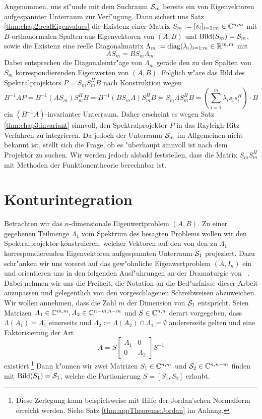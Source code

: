 Angenommen, uns st"unde mit dem Suchraum $\S_m$ bereits ein von Eigenvektoren
aufgespannter Unterraum zur Verf"ugung. Dann sichert uns Satz \ref{thm:chap2:realEigenvalues} die Existenz einer Matrix $S_m := [s_i]_{i=1:m}\in\C^{n,m}$ mit
$B$-orthonormalen Spalten aus Eigenvektoren von $(A,B)$ und $\Bild(S_m)=\S_m$, sowie die Existenz eine reelle Diagonalmatrix
$\Lambda_m := \text{diag}(\lambda_i)_{i=1:m}\in\R^{m,m}$ mit
\[
AS_m = BS_m\Lambda_m.
\]
Dabei entsprechen die Diagonaleintr"age von $\Lambda_m$ gerade den zu den Spalten
von $S_m$ korrespondierenden Eigenwerten von $(A,B)$. Folglich w"are das Bild
des Spektralprojektors $P=S_m S_m^H B$ nach Konstruktion wegen
\[
B^{-1}AP = B^{-1}(AS_m)S_m^H B = B^{-1}(BS_m \Lambda)S_m^H B
= S_m\Lambda S_m^H B = \left(\sum_{i=1}^m \lambda_i s_i s_i^H\right)\cdot B
\]
ein $(B^{-1}A)$-invarianter Unterraum. Daher erscheint es
wegen Satz \ref{thm:chap3:invariant} sinnvoll, den Spektralprojektor $P$ in das
Rayleigh-Ritz-Verfahren zu integrieren.
Da jedoch der Unterraum $\S_m$ im Allgemeinen nicht bekannt ist, stellt sich die Frage, ob es
"uberhaupt sinnvoll ist nach dem Projektor zu suchen.
Wir werden jedoch alsbald feststellen, dass %
die Matrix $S_m S_m^H$ mit Methoden der Funktionentheorie berechnbar ist.

\section{Konturintegration}\label{sec:kontur}

Betrachten wir das $n$-dimensionale Eigenwertproblem $(A,B)$. Zu einer gegebenen Teilmenge $\Lambda_1$ vom Spektrum des besagten Problems wollen wir
den Spektralprojektor konstruieren, welcher Vektoren auf den von den zu $\Lambda_1$ korrespondierenden Eigenvektoren aufgespannten Unterraum $\S_1$ projeziert.
Dazu schr"anken wir uns vorerst auf das gew"ohnliche Eigenwertproblem $(A,I_n)$ ein und orientieren
uns in
den folgenden Ausf"uhrungen an der Dramaturgie von ~\cite[Abschnitt 4.9]{liesen}.
Dabei nehmen wir uns die Freiheit, die Notation an die Bed"urfnisse dieser Arbeit anzupassen und gelegentlich von den vorgeschlagenen Schreibweisen abzuweichen.\\

Wir wollen annehmen, dass die Zahl $m$ der Dimension von $\S_1$ entspricht. Seien Matrizen $A_1\in\C^{m,m},
A_2\in\C^{n-m,n-m}$ und $S\in\Cnn$ derart vorgegeben, dass  $\Lambda(A_1) = \Lambda_1$ einerseits und $\Lambda_2 := \Lambda(A_2) \cap \Lambda_1 = \emptyset$ andererseits gelten und eine Faktorisierung der Art
\begin{equation}\label{eq:chap3:factorization}
A = S\begin{bmatrix} A_1 & 0 \\ 0 & A_2 \end{bmatrix} S^{-1}
\end{equation}
existiert.\footnote{Diese Zerlegung kann beispielsweise mit Hilfe der Jordan'schen Normalform erreicht werden. Siehe Satz \ref{thm:appTheorems:Jordan} im Anhang.}
Dann k"onnen wir zwei Matrizen $S_1 \in \C^{n,m}$ und
$\S_2 \in \C^{n,n-m}$ finden mit $\Bild(S_1) = \S_1$, welche die Partionierung $S=[S_1, S_2]$ erlaubt.

